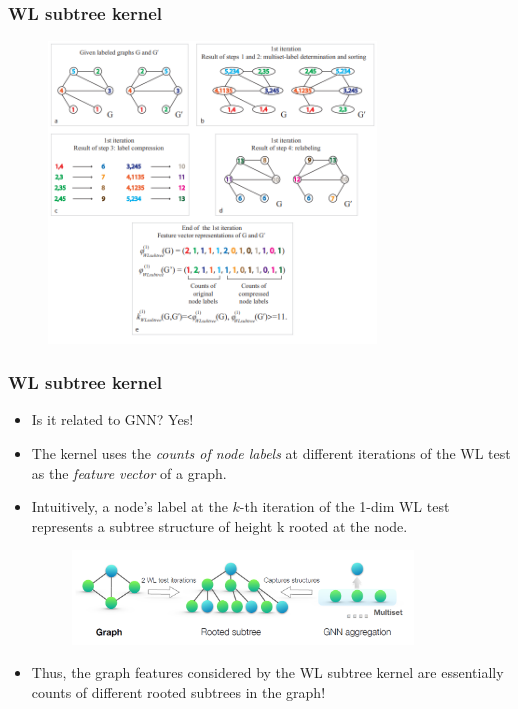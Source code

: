 \documentclass{beamer}
\begin{document}
\begin{frame}
\frametitle{WL subtree kernel}

\begin{figure}[hbt]
	\includegraphics[height=8cm]{fig1.png}
\end{figure}

\end{frame}

\begin{frame}
\frametitle{WL subtree kernel}

\begin{itemize}
	\item Is it related to GNN? Yes! \pause
	
	\item The kernel uses the {\it counts of node labels} at different iterations of the WL test as the {\it feature vector} of a graph. \pause
	
	\item Intuitively, a node’s label at the $k$-th iteration of the 1-dim WL test represents a subtree structure of height k rooted at the node.

	\begin{figure}[hbt]
		\includegraphics[height=2.5cm]{fig2.png}
	\end{figure}

	\item Thus, the graph features considered by the WL subtree kernel are essentially counts of different rooted subtrees in the graph!

\end{itemize}

\end{frame}
\end{document}

